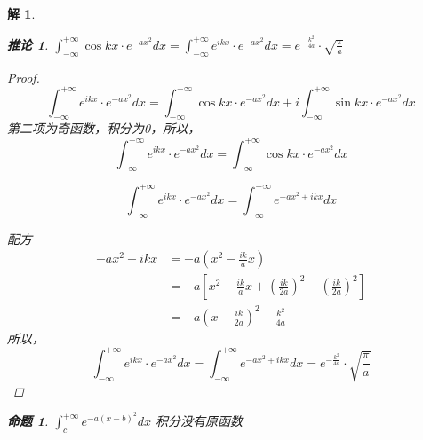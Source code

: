 \documentclass[12pt,a4paper]{article}
\newtheorem*{solution}{解}
\newtheorem{corollary}{推论}
\newtheorem{proposition}{命题}
\begin{document}
\begin{solution}
\begin{corollary}\label{ex:4}
	$\int_{-\infty}^{+\infty} \cos kx \cdot e^{-a x^2} dx=\int_{-\infty}^{+\infty} e^{ikx} \cdot e^{-a x^2} dx= e^{-\frac{k^2}{4a}} \cdot \sqrt{\frac{\pi}{a}}$
\end{corollary}

\begin{proof}
	
	\begin{equation*}
		\int_{-\infty}^{+\infty} e^{ikx} \cdot e^{-a x^2} dx =\int_{-\infty}^{+\infty} \cos kx \cdot e^{-a x^2} dx+i\int_{-\infty}^{+\infty} \sin kx \cdot e^{-a x^2} dx
	\end{equation*}
	第二项为奇函数，积分为0，所以，
	\begin{equation*}
		\int_{-\infty}^{+\infty} e^{ikx} \cdot e^{-a x^2} dx =\int_{-\infty}^{+\infty} \cos kx \cdot e^{-a x^2} dx
	\end{equation*}
	
	\begin{equation*}
		\int_{-\infty}^{+\infty} e^{ikx} \cdot e^{-a x^2} dx = \int_{-\infty}^{+\infty} e^{-a x^2 + ikx} dx
	\end{equation*}
	
	配方
	\begin{equation*}
		\begin{split}
			-a x^2 + ikx &= -a \left( x^2 - \frac{ik}{a} x \right) \\
			&= -a \left[ x^2 - \frac{ik}{a} x + \left( \frac{ik}{2a} \right)^2 - \left( \frac{ik}{2a} \right)^2 \right] \\
			&= -a \left( x - \frac{ik}{2a} \right)^2 - \frac{k^2}{4a}
		\end{split}
	\end{equation*}
	所以，
	\begin{equation*}
		\int_{-\infty}^{+\infty} e^{ikx} \cdot e^{-a x^2} dx = \int_{-\infty}^{+\infty} e^{-a x^2 + ikx} dx	= e^{-\frac{k^2}{4a}} \cdot \sqrt{\frac{\pi}{a}}
	\end{equation*}
\end{proof}



		
		
		
		
		
		
		
		
		\begin{proposition}
			\label{ex:3}
			$	\int_{c}^{+\infty} e^{-a(x-b)^2} dx$
			积分没有原函数
		\end{proposition}


\end{solution}
\end{document}
